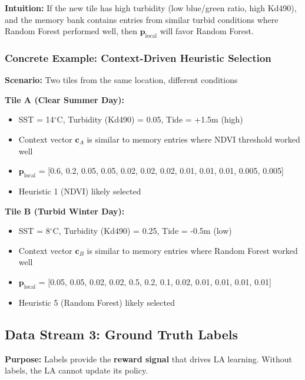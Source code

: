 \documentclass[11pt]{article}
\begin{document}
\textbf{Intuition:} If the new tile has high turbidity (low blue/green ratio, high Kd490), and the memory bank contains entries from similar turbid conditions where Random Forest performed well, then $\mathbf{p}_{\text{local}}$ will favor Random Forest.

\subsubsection{Concrete Example: Context-Driven Heuristic Selection}

\textbf{Scenario:} Two tiles from the same location, different conditions

\textbf{Tile A (Clear Summer Day):}
\begin{itemize}
    \item SST = 14$^\circ$C, Turbidity (Kd490) = 0.05, Tide = +1.5m (high)
    \item Context vector $\mathbf{c}_A$ is similar to memory entries where NDVI threshold worked well
    \item $\mathbf{p}_{\text{local}}$ = [0.6, 0.2, 0.05, 0.05, 0.02, 0.02, 0.02, 0.01, 0.01, 0.01, 0.005, 0.005]
    \item Heuristic 1 (NDVI) likely selected
\end{itemize}

\textbf{Tile B (Turbid Winter Day):}
\begin{itemize}
    \item SST = 8$^\circ$C, Turbidity (Kd490) = 0.25, Tide = -0.5m (low)
    \item Context vector $\mathbf{c}_B$ is similar to memory entries where Random Forest worked well
    \item $\mathbf{p}_{\text{local}}$ = [0.05, 0.05, 0.02, 0.02, 0.5, 0.2, 0.1, 0.02, 0.01, 0.01, 0.01, 0.01]
    \item Heuristic 5 (Random Forest) likely selected
\end{itemize}

\subsection{Data Stream 3: Ground Truth Labels}

\textbf{Purpose:} Labels provide the \textbf{reward signal} that drives LA learning. Without labels, the LA cannot update its policy.
\end{document}
